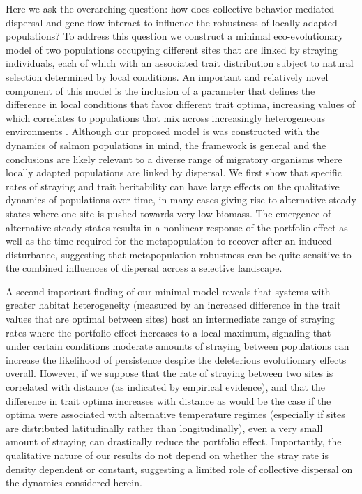 \documentclass[twocolumn,preprintnumbers,amsmath,amssymb,superscriptaddress]{revtex4}
\begin{document}
Here we ask the overarching question: how does collective behavior mediated dispersal and gene flow interact to influence the robustness of locally adapted populations?
To address this question we construct a minimal eco-evolutionary model of two populations occupying different sites that are linked by straying individuals, each of which with an associated trait distribution subject to natural selection determined by local conditions.
An important and relatively novel component of this model is the inclusion of a parameter that defines the difference in local conditions that favor different trait optima, increasing values of which correlates to populations that mix across increasingly heterogeneous environments \cite[though see ]{Berdahl:2015kv}.
Although our proposed model is was constructed with the dynamics of salmon populations in mind, the framework is general and the conclusions are likely relevant to a diverse range of migratory organisms where locally adapted populations are linked by dispersal.
We first show that specific rates of straying and trait heritability can have large effects on the qualitative dynamics of populations over time, in many cases giving rise to alternative steady states where one site is pushed towards very low biomass.
The emergence of alternative steady states results in a nonlinear response of the portfolio effect as well as the time required for the metapopulation to recover after an induced disturbance, suggesting that metapopulation robustness can be quite sensitive to the combined influences of dispersal across a selective landscape.


A second important finding of our minimal model reveals that systems with greater habitat heterogeneity (measured by an increased difference in the trait values that are optimal between sites) host an intermediate range of straying rates where the portfolio effect increases to a local maximum, signaling that under certain conditions moderate amounts of straying between populations can increase the likelihood of persistence despite the deleterious evolutionary effects overall.
However, if we suppose that the rate of straying between two sites is correlated with distance (as indicated by empirical evidence), and that the difference in trait optima increases with distance as would be the case if the optima were associated with alternative temperature regimes (especially if sites are distributed latitudinally rather than longitudinally), even a very small amount of straying can drastically reduce the portfolio effect.
Importantly, the qualitative nature of our results do not depend on whether the stray rate is density dependent or constant, suggesting a limited role of collective dispersal on the dynamics considered herein.
\end{document}
